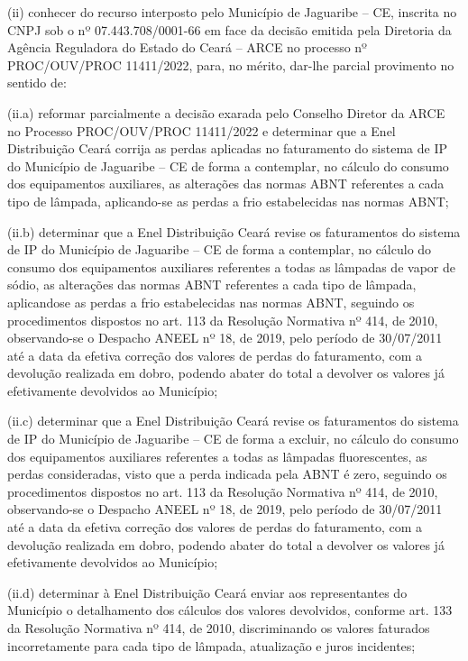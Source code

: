 \begin{enumerate}[resume]
{(ii) conhecer do recurso interposto pelo Município de Jaguaribe – CE, inscrita no CNPJ sob o nº 07.443.708/0001-66 em face da decisão emitida pela Diretoria da Agência Reguladora do Estado do Ceará – ARCE no processo nº PROC/OUV/PROC 11411/2022, para, no mérito, dar-lhe parcial provimento no sentido de:  

(ii.a) reformar parcialmente a decisão exarada pelo Conselho Diretor da ARCE no Processo PROC/OUV/PROC 11411/2022 e determinar que a Enel Distribuição Ceará corrija as perdas aplicadas no faturamento do sistema de IP do Município de Jaguaribe – CE de forma a contemplar, no cálculo do consumo dos equipamentos auxiliares, as alterações das normas ABNT referentes a cada tipo de lâmpada, aplicando-se as perdas a frio estabelecidas nas normas ABNT;  

(ii.b) determinar que a Enel Distribuição Ceará revise os faturamentos do sistema de IP do Município de Jaguaribe – CE de forma a contemplar, no cálculo do consumo dos equipamentos auxiliares referentes a todas as lâmpadas de vapor de sódio, as alterações das normas ABNT referentes a cada tipo de lâmpada, aplicandose as perdas a frio estabelecidas nas normas ABNT, seguindo os procedimentos dispostos no art. 113 da Resolução Normativa nº 414, de 2010, observando-se o Despacho ANEEL nº 18, de 2019, pelo período de 30/07/2011 até a data da efetiva correção dos valores de perdas do faturamento, com a devolução realizada em dobro, podendo abater do total a devolver os valores já efetivamente devolvidos ao Município;  

(ii.c) determinar que a Enel Distribuição Ceará revise os faturamentos do sistema de IP do Município de Jaguaribe – CE de forma a excluir, no cálculo do consumo dos equipamentos auxiliares referentes a todas as lâmpadas fluorescentes, as perdas consideradas, visto que a perda indicada pela ABNT é zero, seguindo os procedimentos dispostos no art. 113 da Resolução Normativa nº 414, de 2010, observando-se o Despacho ANEEL nº 18, de 2019, pelo período de 30/07/2011 até a data da efetiva correção dos valores de perdas do faturamento, com a devolução realizada em dobro, podendo abater do total a devolver os valores já efetivamente devolvidos ao Município;  

(ii.d) determinar à Enel Distribuição Ceará enviar aos representantes do Município o detalhamento dos cálculos dos valores devolvidos, conforme art. 133 da Resolução Normativa nº 414, de 2010, discriminando os valores faturados incorretamente para cada tipo de lâmpada, atualização e juros incidentes;  

}
\end{enumerate}

